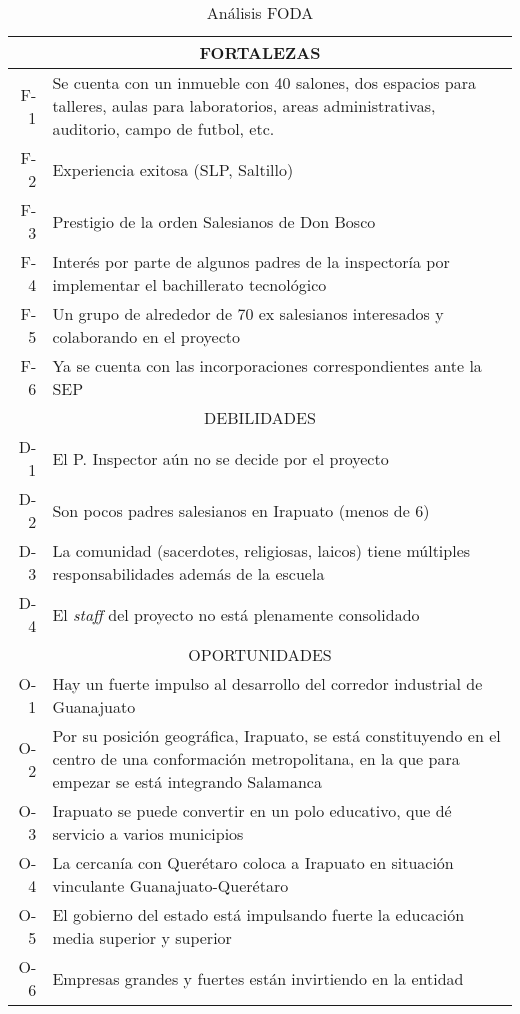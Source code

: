 \begin{table}[h!]
    \centering
    \caption{Análisis FODA}
    \label{tbl:Foda}
    \footnotesize
    \begin{tabular}{r|p{5in}}
    	\multicolumn{2}{c}{FORTALEZAS} \\
    	\hline
    	\hline
    	F-1 & Se cuenta con un inmueble con 40 salones, dos espacios para talleres, aulas para laboratorios, areas administrativas, auditorio, campo de futbol, etc. \\
    	F-2 & Experiencia exitosa (SLP, Saltillo) \\
    	F-3 & Prestigio de la orden Salesianos de Don Bosco \\
    	F-4 & Interés por parte de algunos padres de la inspectoría por implementar el bachillerato tecnológico \\
    	F-5 & Un grupo de alrededor de 70 ex salesianos interesados y colaborando en el proyecto \\
    	F-6 & Ya se cuenta con las incorporaciones correspondientes ante la SEP \\
    	\hline
    	\multicolumn{2}{c}{DEBILIDADES} \\
    	\hline
    	\hline
    	D-1 & El P. Inspector aún no se decide por el proyecto \\
    	D-2 & Son pocos padres salesianos en Irapuato (menos de 6) \\
    	D-3 & La comunidad (sacerdotes, religiosas, laicos) tiene múltiples responsabilidades además de la escuela \\
    	D-4 & El \emph{staff} del proyecto no est\'a plenamente consolidado \\
    	\hline
    	\multicolumn{2}{c}{OPORTUNIDADES} \\
    	\hline
    	\hline
    	O-1 & Hay un fuerte impulso al desarrollo del corredor industrial de Guanajuato \\
    	O-2 & Por su posición geográfica, Irapuato, se está constituyendo en el centro de una conformación metropolitana, en la que para empezar se está integrando Salamanca \\
    	O-3 & Irapuato se puede convertir en un polo educativo, que dé servicio a varios municipios \\
    	O-4 & La cercanía con Querétaro coloca a Irapuato en situación vinculante Guanajuato-Querétaro \\
    	O-5 & El gobierno del estado está impulsando fuerte la educación media superior y superior \\
    	O-6 & Empresas grandes y fuertes están invirtiendo en la entidad \\

\end{tabular}
\end{table}
